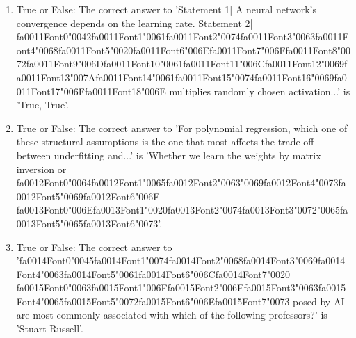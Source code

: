 \documentclass[12pt]{article}
\begin{document}
\begin{enumerate}[label=\arabic*.]
\item True or False: The correct answer to 'Statement 1| A neural network's convergence depends on the learning rate. Statement 2| {\csname fa0011Font0\endcsname\char"0042}{\csname fa0011Font1\endcsname\char"0061}{\csname fa0011Font2\endcsname\char"0074}{\csname fa0011Font3\endcsname\char"0063}{\csname fa0011Font4\endcsname\char"0068}{\csname fa0011Font5\endcsname\char"0020}{\csname fa0011Font6\endcsname\char"006E}{\csname fa0011Font7\endcsname\char"006F}{\csname fa0011Font8\endcsname\char"0072}{\csname fa0011Font9\endcsname\char"006D}{\csname fa0011Font10\endcsname\char"0061}{\csname fa0011Font11\endcsname\char"006C}{\csname fa0011Font12\endcsname\char"0069}{\csname fa0011Font13\endcsname\char"007A}{\csname fa0011Font14\endcsname\char"0061}{\csname fa0011Font15\endcsname\char"0074}{\csname fa0011Font16\endcsname\char"0069}{\csname fa0011Font17\endcsname\char"006F}{\csname fa0011Font18\endcsname\char"006E} multiplies randomly chosen activation...' is 'True, True'.
\item True or False: The correct answer to 'For polynomial regression, which one of these structural assumptions is the one that most affects the trade-off between underfitting and...' is 'Whether we learn the weights by matrix inversion or {\csname fa0012Font0\endcsname\char"0064}{\csname fa0012Font1\endcsname\char"0065}{\csname fa0012Font2\endcsname\char"0063}{\char"0069}{\csname fa0012Font4\endcsname\char"0073}{\csname fa0012Font5\endcsname\char"0069}{\csname fa0012Font6\endcsname\char"006F} {\csname fa0013Font0\endcsname\char"006E}{\csname fa0013Font1\endcsname\char"0020}{\csname fa0013Font2\endcsname\char"0074}{\csname fa0013Font3\endcsname\char"0072}{\char"0065}{\csname fa0013Font5\endcsname\char"0065}{\csname fa0013Font6\endcsname\char"0073}'.
\item True or False: The correct answer to '{\csname fa0014Font0\endcsname\char"0045}{\csname fa0014Font1\endcsname\char"0074}{\csname fa0014Font2\endcsname\char"0068}{\csname fa0014Font3\endcsname\char"0069}{\csname fa0014Font4\endcsname\char"0063}{\csname fa0014Font5\endcsname\char"0061}{\csname fa0014Font6\endcsname\char"006C}{\csname fa0014Font7\endcsname\char"0020} {\csname fa0015Font0\endcsname\char"0063}{\csname fa0015Font1\endcsname\char"006F}{\csname fa0015Font2\endcsname\char"006E}{\csname fa0015Font3\endcsname\char"0063}{\csname fa0015Font4\endcsname\char"0065}{\csname fa0015Font5\endcsname\char"0072}{\csname fa0015Font6\endcsname\char"006E}{\csname fa0015Font7\endcsname\char"0073} posed by AI are most commonly associated with which of the following professors?' is 'Stuart Russell'.

\end{enumerate}
\end{document}
